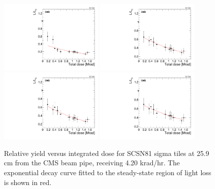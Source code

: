 \begin{figure}[tbp!]
\centering
\includegraphics[width=0.45\textwidth]{figures/SCSN81-S-25p9cm-f7ch2-dose.pdf}
\includegraphics[width=0.45\textwidth]{figures/SCSN81-S-25p9cm-f8ch5-dose.pdf}
\includegraphics[width=0.45\textwidth]{figures/SCSN81-S-25p9cm-f14ch3-dose.pdf}
\includegraphics[width=0.45\textwidth]{figures/SCSN81-S-25p9cm-f16ch1-dose.pdf}
\caption{Relative yield versus integrated dose for SCSN81 sigma tiles at 25.9 cm from the CMS beam pipe, receiving 4.20 krad/hr. The exponential decay curve fitted to the steady-state region of light loss is shown in red.}
\label{fig:SCSN81-S-25p9cm-dose}
\end{figure} 

